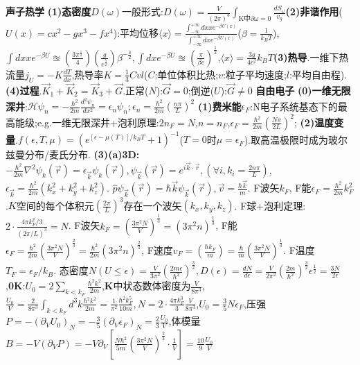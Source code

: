 \documentclass[UTF8,a4paper,10pt,twocolumn]{ctexart}
\begin{document}
  \textbf{声子热学}
  \textbf{(1)态密度}$D(\omega)$一般形式:$D(\omega)=\frac{V}{(2\pi)^3}\int_{\text{K中}\partial\omega=0}\frac{dS_{\omega}}{v_{g}}$\textbf{(2)非谐作用}($U(x)=cx^2-gx^3-fx^4$):平均位移$\langle x\rangle=\frac{\int_{-\infty}^{+\infty}dx xe^{-\beta U(x)}}{\int_{-\infty}^{+\infty}dx e^{-\beta U(x)}}$($\beta=\frac{1}{k_{B}T}$),$\int dx xe^{-\beta U}\approxeq(\frac{3\pi^{\frac{1}{2}}}{4})(\frac{g}{c^{\frac{5}{2}}})\beta^{-\frac{3}{2}},\int dxe^{-\beta U}\approxeq(\frac{\pi}{\beta c})^{\frac{1}{2}}$,$\langle x\rangle=\frac{3g}{4c^2}k_{B}T$\textbf{(3)热导}.一维下热流量$j_{U}=-K\frac{dT}{dx}$,热导率$K=\frac{1}{3}Cvl$($C$:单位体积比热;$v$:粒子平均速度;$l$:平均自由程).\textbf{(4)过程}.$\vec{K}_{1}+\vec{K}_{2}=\vec{K}_{3}+\vec{G}$.正常($N$):$\vec{G}=0$;倒逆($U$):$\vec{G}\neq 0$
   \textbf{自由电子}
  \textbf{(0)一维无限深井}:$\mathcal{H}\psi_{n}=-\frac{\hbar^2}{2m}\frac{d^2\psi_{n}}{dx^2}=\epsilon_{n}\psi_{n};\epsilon_{n}=\frac{\hbar^2}{2m}(\frac{n\pi}{L})^2$
  \textbf{(1)费米能}$\epsilon_{F}$:N电子系统基态下的最高能级;e.g.一维无限深井+泡利原理:$2n_F=N$,$n=n_F$,$\epsilon_F=\frac{\hbar^2}{2m}(\frac{N\pi}{2L})^2$;
  \textbf{(2)温度变量}.$f(\epsilon,T,\mu)=(e^{[\epsilon-\mu(T)]/k_{B}T}+1)^{-1}$($T=0$时$\mu=\epsilon_F$).取高温极限时成为玻尔兹曼分布/麦氏分布.
  \textbf{(3)(a)3D:}
  $-\frac{\hbar^2}{2m}\nabla^2\psi_{k}(\vec{r})=\epsilon_{\vec{k}}\psi_{k}(\vec{r}),\psi_{\vec{k}}(\vec{r})=e^{i\vec{k}\cdot\vec{r}},(\forall i,k_i=\frac{2n\pi}{L})$, 
  $\epsilon_{\vec{k}}=\frac{\hbar^2}{2m}(k_x^2+k_y^2+k_z^2)$.
  $\hat{p}\psi_{\vec{k}}(\vec{r})=\hbar\vec{k}\psi_{\vec{k}}(\vec{r}),\vec{v}=\frac{\hbar\vec{k}}{m}$.
  F波矢$k_F$,
  F能$\epsilon_F=\frac{\hbar^2}{2m}k_{F}^2$.$K$空间的每个体积元$(\frac{2\pi}{L})^3$存在一个波矢$(k_x,k_y,k_z)$.
  F球+泡利定理:$2\cdot\frac{4\pi k_F^2/3}{(2\pi/L)^3}=N$.
  F波矢$k_F=(\frac{3\pi^2N}{V})^{\frac{1}{3}}=(3\pi^2 n)^{\frac{1}{3}}$,
  F能$\epsilon_{F}=\frac{\hbar^2}{2m}(\frac{3\pi^2N}{V})^{\frac{2}{3}}=\frac{\hbar^2}{2m}(3\pi^2n)^{\frac{2}{3}}$,
  F速度$v_F=(\frac{\hbar k_F}{m})=\frac{\hbar}{m}(\frac{3\pi^2N}{V})^{\frac{1}{3}}$.
  F温度$T_F=\epsilon_F/k_B$.
  态密度$N(U\leq\epsilon)=\frac{V}{3\pi^2}(\frac{2m\epsilon}{\hbar^2})^{\frac{3}{2}},D(\epsilon)=\frac{dN}{d\epsilon}=\frac{V}{2\pi^2}(\frac{2m}{\hbar^2})^{\frac{3}{2}}\epsilon^{\frac{1}{2}}=\frac{3N}{2\epsilon}$,\textbf{0K}:$U_0=2\sum_{k<k_F}\frac{\hbar^2k^2}{2m}$,\textbf{K}中状态数体密度为$\frac{V}{8\pi^3}$,$\frac{U_0}{V}=\frac{2}{8\pi^3}\int_{k<k_F}d^3k\frac{\hbar^2k^2}{2m}=\frac{1}{\pi^2}\frac{\hbar^2k_F^5}{10m},N=2\cdot\frac{4\pi k_F^3}{3}\frac{V}{8\pi^3}$,$U_0=\frac{3}{5}N\epsilon_F$,压强$P=-(\partial_VU_0)_N=-\frac{3}{5}(\partial_V\epsilon_F)_N=\frac{2}{3}\frac{U_0}{V}$,体模量$B=-V(\partial_VP)=-V\partial_V[\frac{N\hbar^2}{5m}(\frac{3\pi^2N}{V})^{\frac{2}{3}}\cdot\frac{1}{V}]=\frac{10}{9}\frac{U_0}{V}$
\end{document}
